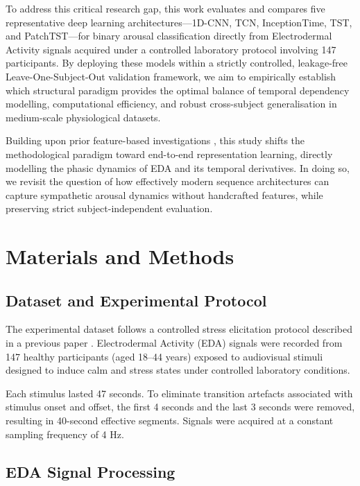 \documentclass[runningheads]{llncs}
\begin{document}
To address this critical research gap, this work evaluates and compares five representative deep learning architectures---1D-CNN, TCN, InceptionTime, TST, and PatchTST---for binary arousal classification directly from Electrodermal Activity signals acquired under a controlled laboratory protocol involving 147 participants. By deploying these models within a strictly controlled, leakage-free Leave-One-Subject-Out validation framework, we aim to empirically establish which structural paradigm provides the optimal balance of temporal dependency modelling, computational efficiency, and robust cross-subject generalisation in medium-scale physiological datasets.

Building upon prior feature-based investigations \cite{SanchezReolid2022}, this study shifts the methodological paradigm toward end-to-end representation learning, directly modelling the phasic dynamics of EDA and its temporal derivatives. In doing so, we revisit the question of how effectively modern sequence architectures can capture sympathetic arousal dynamics without handcrafted features, while preserving strict subject-independent evaluation.

\section{Materials and Methods}

\subsection{Dataset and Experimental Protocol}

The experimental dataset follows a controlled stress elicitation protocol described in a previous paper \cite{sanchez2020deep}. Electrodermal Activity (EDA) signals were recorded from 147 healthy participants (aged 18--44 years) exposed to audiovisual stimuli designed to induce calm and stress states under controlled laboratory conditions.

Each stimulus lasted 47 seconds. To eliminate transition artefacts associated with stimulus onset and offset, the first 4 seconds and the last 3 seconds were removed, resulting in 40-second effective segments. Signals were acquired at a constant sampling frequency of 4 Hz.

\subsection{EDA Signal Processing}
\end{document}
